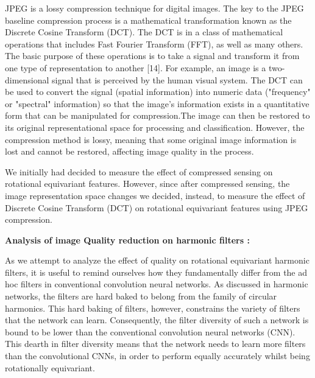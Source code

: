 \documentclass{article}
\begin{document}
JPEG is a lossy compression technique for digital images. The key to the JPEG baseline compression process is a mathematical transformation known as the Discrete Cosine Transform (DCT). The DCT is in a class of mathematical operations that includes Fast Fourier Transform (FFT), as well as many others. The basic purpose of these operations is to take a signal and transform it from one type of representation to another [14]. For example, an image is a two-dimensional signal that is perceived by the human visual system. The DCT can be used to convert the signal (spatial information) into numeric data ("frequency" or "spectral" information) so that the image’s information exists in a quantitative form that can be manipulated for compression.The image can then be restored to its original representational space for processing and classification. However, the compression method is lossy, meaning that some original image information is lost and cannot be restored, affecting image quality in the process.

We initially had decided to measure the effect of compressed sensing on rotational equivariant features. However, since after compressed sensing, the image representation space changes we decided, instead, to measure the effect of Discrete Cosine Transform (DCT) on rotational equivariant features using JPEG compression.


\textbf{Analysis of image Quality reduction on harmonic
filters :}

As we attempt to analyze the effect of quality on rotational equivariant harmonic filters, it is useful to remind ourselves how they fundamentally differ from the ad hoc filters in conventional convolution neural networks. As discussed in harmonic networks, the filters are hard baked to belong from the family of circular harmonics. This hard baking of filters, however, constrains the variety of filters that the network can learn. Consequently, the filter diversity of such a network is bound to be lower than the conventional convolution neural networks (CNN). This dearth in filter diversity means that the network needs to learn more filters than the convolutional CNNs, in order to perform equally accurately whilst being rotationally equivariant.
\end{document}
